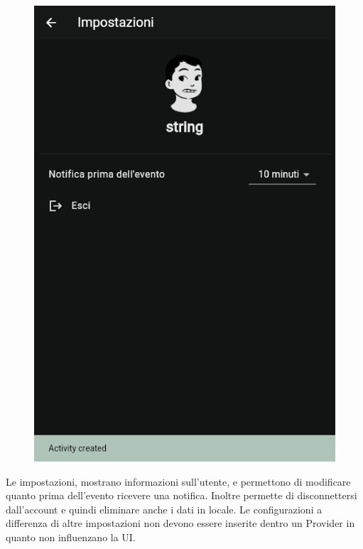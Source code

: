 \documentclass[a4paper,12pt]{article}
\begin{document}
\begin{figure}
    \vspace{-26pt}
    \center
    \includegraphics[width=0.5\linewidth]{img/settings.png}
\end{figure}
Le impostazioni, mostrano informazioni sull'utente, e permettono di modificare quanto prima dell'evento ricevere una notifica. Inoltre permette di disconnettersi dall'account e quindi eliminare anche i dati in locale.
Le configurazioni a differenza di altre impostazioni non devono essere inserite dentro un Provider in quanto non influenzano la UI.
\end{document}
